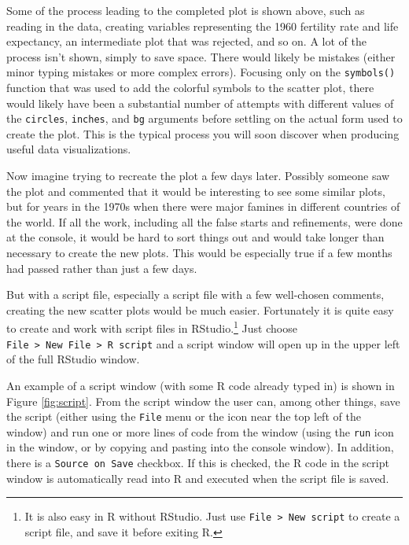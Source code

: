 \documentclass[
]{krantz}
\begin{document}
Some of the process leading to the completed plot is shown above, such as reading in the data, creating variables representing the 1960 fertility rate and life expectancy, an intermediate plot that was rejected, and so on. A lot of the process isn't shown, simply to save space. There would likely be mistakes (either minor typing mistakes or more complex errors). Focusing only on the \texttt{symbols()} function that was used to add the colorful symbols to the scatter plot, there would likely have been a substantial number of attempts with different values of the \texttt{circles}, \texttt{inches}, and \texttt{bg} arguments before settling on the actual form used to create the plot. This is the typical process you will soon discover when producing useful data visualizations.

Now imagine trying to recreate the plot a few days later. Possibly someone saw the plot and commented that it would be interesting to see some similar plots, but for years in the 1970s when there were major famines in different countries of the world. If all the work, including all the false starts and refinements, were done at the console, it would be hard to sort things out and would take longer than necessary to create the new plots. This would be especially true if a few months had passed rather than just a few days.

But with a script file, especially a script file with a few well-chosen comments, creating the new scatter plots would be much easier. Fortunately it is quite easy to create and work with script files in RStudio.\footnote{It is also easy in R without RStudio. Just use \texttt{File\ \textgreater{}\ New\ script} to create a script file, and save it before exiting R.} Just choose \texttt{File\ \textgreater{}\ New\ File\ \textgreater{}\ R\ script} and a script window will open up in the upper left of the full RStudio window.

An example of a script window (with some R code already typed in) is shown in Figure \ref{fig:script}. From the script window the user can, among other things, save the script (either using the \texttt{File} menu or the icon near the top left of the window) and run one or more lines of code from the window (using the \texttt{run} icon in the window, or by copying and pasting into the console window). In addition, there is a \texttt{Source\ on\ Save} checkbox. If this is checked, the R code in the script window is automatically read into R and executed when the script file is saved.
\end{document}
